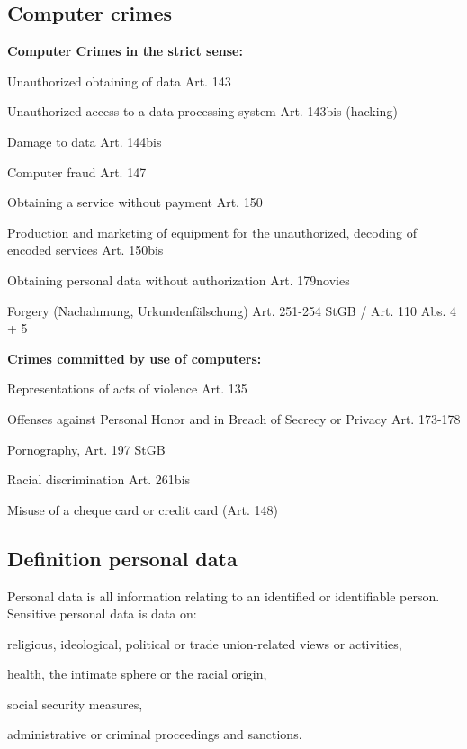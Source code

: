 \subsection{Computer crimes}
\textbf{Computer Crimes in the strict sense:}
\begin{compactitem}
	\item Unauthorized obtaining of data Art. 143
	\item Unauthorized access to a data processing system Art. 143bis (hacking)
	\item Damage to data Art. 144bis
	\item Computer fraud Art. 147
	\item Obtaining a service without payment Art. 150
	\item Production and marketing of equipment for the unauthorized, decoding of encoded services Art. 150bis
	\item Obtaining personal data without authorization Art. 179novies
	\item Forgery (Nachahmung, Urkundenfälschung) Art. 251-254 StGB / Art. 110 Abs. 4 + 5
\end{compactitem}
\textbf{Crimes committed by use of computers:}
\begin{compactitem}
	\item Representations of acts of violence Art. 135
	\item Offenses against Personal Honor and in Breach of Secrecy or Privacy Art. 173-178
	\item Pornography, Art. 197 StGB
	\item Racial discrimination Art. 261bis
	\item Misuse of a cheque card or credit card (Art. 148)
\end{compactitem}

\subsection{Definition personal data}
Personal data is all information relating to an identified or identifiable person. Sensitive personal data is data on:
\begin{compactitem}
	\item religious, ideological, political or trade union-related views or activities,
	\item health, the intimate sphere or the racial origin,
	\item social security measures,
	\item administrative or criminal proceedings and sanctions.
\end{compactitem}

